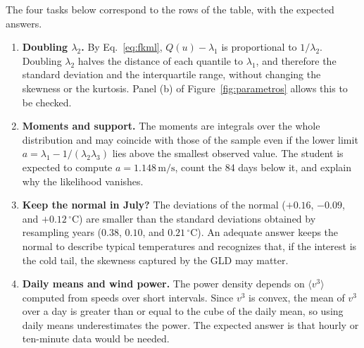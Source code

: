 The four tasks below correspond to the rows of the table, with the expected answers.

\begin{enumerate}
    \item \textbf{Doubling $\lambda_2$.} By Eq.~\eqref{eq:fkml}, $Q(u) - \lambda_1$ is proportional to $1/\lambda_2$. Doubling $\lambda_2$ halves the distance of each quantile to $\lambda_1$, and therefore the standard deviation and the interquartile range, without changing the skewness or the kurtosis. Panel (b) of Figure~\ref{fig:parametros} allows this to be checked.
    \item \textbf{Moments and support.} The moments are integrals over the whole distribution and may coincide with those of the sample even if the lower limit $a = \lambda_1 - 1/(\lambda_2\lambda_3)$ lies above the smallest observed value. The student is expected to compute $a = 1.148\,\text{m/s}$, count the 84 days below it, and explain why the likelihood vanishes.
    \item \textbf{Keep the normal in July?} The deviations of the normal ($+0.16$, $-0.09$, and $+0.12\,^\circ$C) are smaller than the standard deviations obtained by resampling years ($0.38$, $0.10$, and $0.21\,^\circ$C). An adequate answer keeps the normal to describe typical temperatures and recognizes that, if the interest is the cold tail, the skewness captured by the GLD may matter.
    \item \textbf{Daily means and wind power.} The power density depends on $\langle v^3\rangle$ computed from speeds over short intervals. Since $v^3$ is convex, the mean of $v^3$ over a day is greater than or equal to the cube of the daily mean, so using daily means underestimates the power. The expected answer is that hourly or ten-minute data would be needed.
\end{enumerate}
\par

